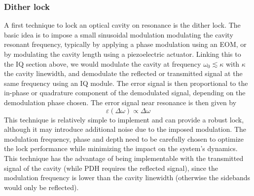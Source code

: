 \subsubsection{Dither lock}
A first technique to lock an optical cavity on resonance is the dither lock. The basic idea is to impose a small sinusoidal modulation modulating the cavity resonant frequency, typically by applying a phase modulation using an EOM, or by modulating the cavity length using a piezoelectric actuator. Linking this to the IQ section above, we would modulate the cavity at frequency \(\omega_0 \lesssim \kappa\) with $\kappa$ the cavity linewidth, and demodulate the reflected or transmitted signal at the same frequency using an IQ module. The error signal is then proportional to the in-phase or quadrature component of the demodulated signal, depending on the demodulation phase chosen. The error signal near resonance is then given by
\begin{equation}
\varepsilon(\Delta \omega) \propto \Delta \omega
\end{equation}
This technique is relatively simple to implement and can provide a robust lock, although it may introduce additional noise due to the imposed modulation. The modulation frequency, phase and depth need to be carefully chosen to optimize the lock performance while minimizing the impact on the system's dynamics. This technique has the advantage of being implementable with the transmitted signal of the cavity (while PDH requires the reflected signal), since the modulation frequency is lower than the cavity linewidth (otherwise the sidebands would only be reflected). 


